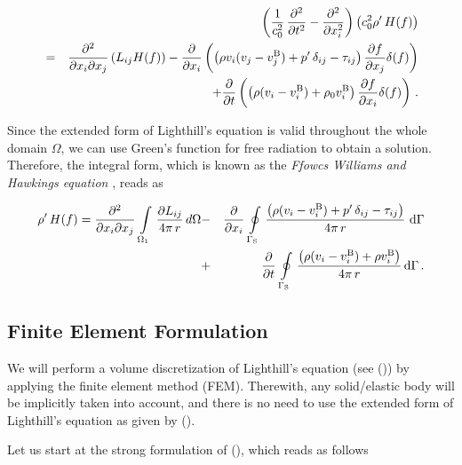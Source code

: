 \documentclass[a4paper,10pt]{article}
\begin{document}
\begin{eqnarray}
\label{eq:eLend}
&&\left( \frac{1}{c_0^2}\, \frac{\partial^2}{\partial t^2} - \frac{\partial^2
}{\partial x_i^2} \right)
\left( c_0^2 \rho'\, H(f) \right) \nonumber \\
&=&
\frac{\partial^2}{\partial x_i \partial x_j} \left( L_{ij} H(f)
\right)  - \frac{\partial }{\partial x_i} \left( \left( \rho v_i (v_j -
    v^{\rm B}_j)   +
p'\, \delta_{ij} - \tau_{ij} \right) \frac{\partial f}{\partial
x_j} \delta(f) \right) \nonumber \\
&&+
 \frac{\partial}{\partial t} \left(  \left(\rho(v_i - v^{\rm B}_i) + \rho_0
    v^{\rm B}_i \right) \frac{\partial f}{\partial x_i} \delta(f) \right)\,.
\end{eqnarray}

\noindent
Since the  extended form of  Lighthill's equation is valid  throughout the
whole domain $\Omega$,  we can use Green's function  for free radiation to
obtain a  solution. Therefore,  the integral form,  which is known  as the
{\it  Ffowcs Williams  and Hawkings  equation} \cite{Ffowcs-Williams1969},
reads as

\begin{eqnarray}
 \rho'\, H(f) = \frac{\partial^2}{\partial x_i \partial x_j} \,
\int\limits_{\Omega_1}\, \frac{\partial L_{ij}}{4\pi\, r}\,d\Omega
&-& \frac{\partial }{\partial x_i} \, \oint\limits_{\Gamma_{\rm S}}\, 
\frac{ \left(\rho(v_i - v^{\rm B}_i) + p'\, \delta_{ij} - \tau_{ij}
  \right)}{4\pi\, r} \,{\,\rm d}\Gamma \nonumber\\
&+& \frac{\partial }{\partial t} \, \oint\limits_{\Gamma_{\rm S}}\,
\frac{\left(\rho(v_i - v^{\rm B}_i) + \rho
    v^{\rm B}_i \right)}{4\pi \, r} {\,\rm d}\Gamma\,.
\end{eqnarray}

\newpage
\subsection{Finite Element Formulation}
\label{sec:fe}

We  will perform  a  volume discretization  of  Lighthill's equation  (see
()) by  applying the finite  element method (FEM).  Therewith, any
solid/elastic body will be implicitly  taken into account, and there is no
need  to  use  the extended  form  of  Lighthill's  equation as  given  by
().

Let  us start  at the  strong formulation  of (),  which  reads as
follows
\end{document}
